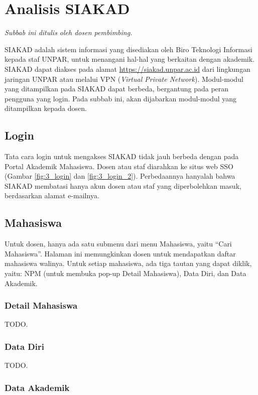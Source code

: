    
\section{Analisis SIAKAD}

\textit{Subbab ini ditulis oleh dosen pembimbing.}

SIAKAD adalah sistem informasi yang disediakan oleh Biro Teknologi Informasi kepada staf UNPAR, untuk menangani hal-hal yang berkaitan dengan akademik. SIAKAD dapat diakses pada alamat \url{https://siakad.unpar.ac.id} dari lingkungan jaringan UNPAR atau melalui VPN (\textit{Virtual Private Network}). Modul-modul yang ditampilkan pada SIAKAD dapat berbeda, bergantung pada peran pengguna yang login. Pada subbab ini, akan dijabarkan modul-modul yang ditampilkan kepada dosen.

\subsection{Login}

Tata cara login untuk mengakses SIAKAD tidak jauh berbeda dengan pada Portal Akademik Mahasiswa. Dosen atau staf diarahkan ke situs web SSO (Gambar \ref{fig:3_login} dan \ref{fig:3_login_2}). Perbedaannya hanyalah bahwa SIAKAD membatasi hanya akun dosen atau staf yang diperbolehkan masuk, berdasarkan alamat e-mailnya.

\subsection{Mahasiswa}

Untuk dosen, hanya ada satu submenu dari menu Mahasiswa, yaitu ``Cari Mahasiswa''. Halaman ini memungkinkan dosen untuk mendapatkan daftar mahasiswa walinya. Untuk setiap mahasiswa, ada tiga tautan yang dapat diklik, yaitu: NPM (untuk membuka pop-up Detail Mahasiswa), Data Diri, dan Data Akademik.

\subsubsection{Detail Mahasiswa}

TODO.

\subsubsection{Data Diri}

TODO.

\subsubsection{Data Akademik}

